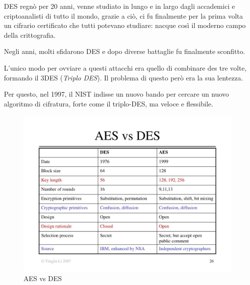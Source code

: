 

\textsf{\small DES regnò per 20 anni, venne studiato in lungo e in largo dagli accademici e criptoanalisti di tutto il mondo, grazie a ciò, ci fu finalmente per la prima volta un cifrario certificato che tutti potevano studiare: nacque così il moderno campo della crittografia.}


\textsf{\small Negli anni, molti sfidarono DES e dopo diverse battaglie fu finalmente sconfitto.} %


\textsf{\small L'unico modo per ovviare a questi attacchi era quello di combinare des tre volte, formando il 3DES (\emph{Triplo DES}). Il problema di questo però era la sua lentezza.} %


\textsf{\small Per questo, nel 1997, il NIST indisse un nuovo bando per cercare un nuovo algoritmo di cifratura, forte come il triplo-DES, ma veloce e flessibile.}

\begin{figure}[H]
	\centering
	\includegraphics[width=1\textwidth, height=1\textheight, keepaspectratio]{./images/des_vs_aes/aes-vs-des.png}
	\caption{AES vs DES}
	\label{fig:aes_vs_des}
\end{figure}

